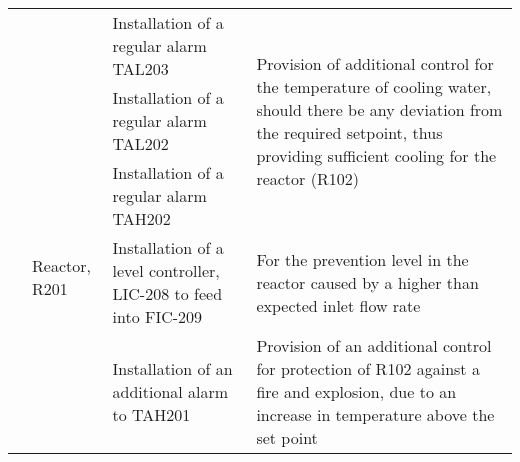 \begin{table}[p]
\begin{tabularx}{\linewidth}{@{}lp{2cm}XX@{}}
     &                           & Installation of a regular alarm TAL203                                                                                                                        & \multirow[t]{3}{=}{Provision of additional control for the temperature of cooling water, should there be any deviation from the required setpoint, thus providing sufficient cooling for the reactor (R102)} \\ \cmidrule(lr){3-3}
     &                           & Installation of a regular alarm TAL202                                                                                                                        &                                                                                                                                                                                                                                                         \\ \cmidrule(lr){3-3}
     &                           & Installation of a regular alarm TAH202                                                                                                                        &                                                                                                                                                                                                                                                         \\ \cmidrule(l){2-4} 
     & Reactor, R201             & \multirow[t]{2}{=}{Installation of a level controller, LIC-208 to feed into FIC-209}                                                                          & \multirow[t]{2}{=}{For the prevention level in the reactor caused by a higher than expected inlet flow rate}                                                                                                     \\
     &                           &                                                                                                                                                               &                                                                                                                                                                                                                                                         \\ \cmidrule(l){3-4} 
     &                           & \multirow[t]{2}{=}{Installation of an additional alarm to TAH201}                                                                                             & \multirow[t]{2}{=}{Provision of an additional control for protection of R102 against a fire and explosion, due to an increase in temperature above the set point}                                           \\

\end{tabularx}
\end{table}
